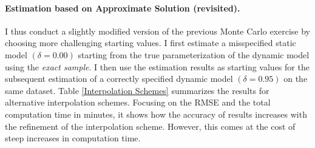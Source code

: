 \paragraph{Estimation based on Approximate Solution (revisited).}
I thus conduct a slightly modified version of the previous Monte Carlo exercise by choosing more challenging starting values. I first estimate a misspecified static model $(\delta = 0.00)$ starting from the true parameterization of the dynamic model using the \textit{exact sample}. I then use the estimation results as starting values for the subsequent estimation of a correctly specified dynamic model $(\delta = 0.95)$ on the same dataset. Table \ref{Interpolation Schemes} summarizes the results for alternative interpolation schemes. Focusing on the RMSE and the total computation time in minutes, it shows how the accuracy of results increases with the refinement of the interpolation scheme. However, this comes at the cost of steep increases in computation time.

